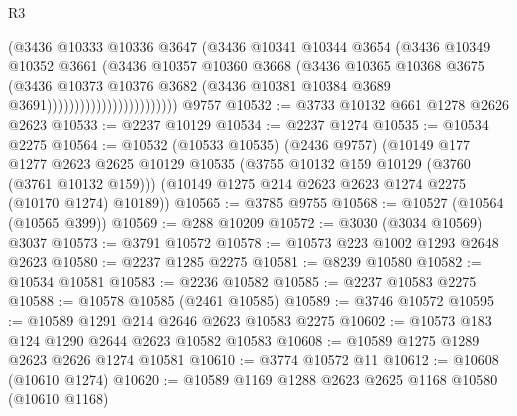 \begin{lexlean}{R3}
\begin{coremodule}
                                      (@3436
                                        @10333
                                        @10336
                                        @3647
                                        (@3436
                                          @10341
                                          @10344
                                          @3654
                                          (@3436
                                            @10349
                                            @10352
                                            @3661
                                            (@3436
                                              @10357
                                              @10360
                                              @3668
                                              (@3436
                                                @10365
                                                @10368
                                                @3675
                                                (@3436
                                                  @10373
                                                  @10376
                                                  @3682
                                                  (@3436
                                                    @10381
                                                    @10384
                                                    @3689
                                                    @3691))))))))))))))))))))))))
    @9757
@10532 := @3733 @10132 @661 @1278 @2626 @2623
@10533 := @2237 @10129
@10534 := @2237 @1274
@10535 := @10534 @2275
@10564 := @10532
    (@10533 @10535)
    (@2436 @9757)
    (@10149
      @177
      @1277
      @2623
      @2625
      @10129
      @10535
      (@3755 @10132 @159 @10129 (@3760 (@3761 @10132 @159)))
      (@10149 @1275 @214 @2623 @2623 @1274 @2275 (@10170 @1274) @10189))
@10565 := @3785 @9755
@10568 := @10527 (@10564 (@10565 @399))
@10569 := @288 @10209
@10572 := @3030 (@3034 @10569) @3037
@10573 := @3791 @10572
@10578 := @10573 @223 @1002 @1293 @2648 @2623
@10580 := @2237 @1285 @2275
@10581 := @8239 @10580
@10582 := @10534 @10581
@10583 := @2236 @10582
@10585 := @2237 @10583 @2275
@10588 := @10578 @10585 (@2461 @10585)
@10589 := @3746 @10572
@10595 := @10589 @1291 @214 @2646 @2623 @10583 @2275
@10602 := @10573 @183 @124 @1290 @2644 @2623 @10582 @10583
@10608 := @10589 @1275 @1289 @2623 @2626 @1274 @10581
@10610 := @3774 @10572 @11
@10612 := @10608 (@10610 @1274)
@10620 := @10589 @1169 @1288 @2623 @2625 @1168 @10580 (@10610 @1168)

\end{coremodule}
\end{lexlean}
